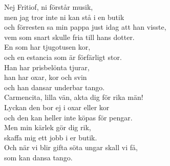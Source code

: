 \documentclass[a6paper,10pt]{article}
\begin{document}
\begin{lyrics}
\newpage
\setlength{\oddsidemargin}{-0.47in}
\noindent
Nej Fritiof, ni förstår musik, \\
men jag tror inte ni kan stå i en butik \\
och förresten sa min pappa just idag att han visste, \\
vem som snart skulle fria till hans dotter. \\
En som har tjugotusen kor, \\
och en estancia som är förfärligt stor. \\
Han har prisbelönta tjurar, \\
han har oxar, kor och svin \\
och han dansar underbar tango. 
\vspace{5pt}\\
Carmencita, lilla vän, akta dig för rika män! \\
Lyckan den bor ej i oxar eller kor \\
och den kan heller inte köpas för pengar. \\
Men min kärlek gör dig rik, \\
skaffa mig ett jobb i er butik. \\
Och när vi blir gifta söta ungar skall vi få, \\
som kan dansa tango.
\end{lyrics}
	    
\end{document}
